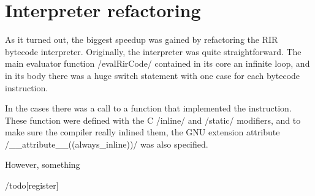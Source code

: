 \section{Interpreter refactoring}

As it turned out, the biggest speedup was gained by refactoring the RIR bytecode interpreter. Originally, the interpreter was quite straightforward. The main evaluator function \cinline/evalRirCode/ contained in its core an infinite loop, and in its body there was a huge switch statement with one case for each bytecode instruction.

In the cases there was a call to a function that implemented the instruction. These function were defined with the C \cinline/inline/ and \cinline/static/ modifiers, and to make sure the compiler really inlined them, the GNU extension attribute \cinline/__attribute__((always_inline))/ was also specified.

However, something 

\begin{listing}[htbp]
  \caption{\label{lst:}}
  \begin{rcode}

  \end{rcode}
\end{listing}

/todo[register]





